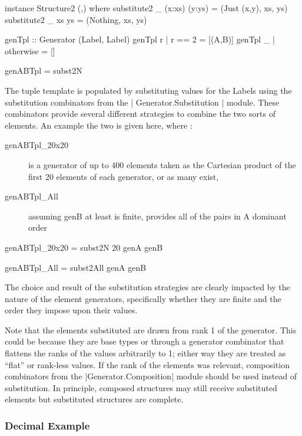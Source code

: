 \begin{code}
instance Structure2 (,) where
  substitute2 _ (x:xs) (y:ys) = (Just (x,y), xs, ys)
  substitute2 _ xs ys = (Nothing, xs, ys)
  
genTpl :: Generator (Label, Label)
genTpl r | r == 2    = [(A,B)]
genTpl _ | otherwise = []

genABTpl = subst2N
\end{code}

The tuple template is populated by substituting values for the Labels
using the substitution combinators from the | Generator.Substitution | module.
These combinators provide several different strategies to combine the two sorts of elements. 
An example the two is given here, where :

\begin{description}
\item[genABTpl\_20x20] { is a generator of up to 400 elements taken as 
the Cartesian product of the first 20 elements of each generator, or as many exist,}
\item[genABTpl\_All] {assuming genB at least is finite, provides all of the pairs in 
A dominant order}
\end{description}

\begin{code}
genABTpl_20x20 = subst2N 20 genA genB

genABTpl_All = subst2All genA genB
\end{code}

The choice and result of the substitution strategies are clearly impacted by
the nature of the element generators, specifically whether they are finite
and the order they impose upon their values.  

Note that the elements substituted are drawn from rank 1 of the generator.
This could be because they are base types or through a generator combinator
that flattens the ranks of the values arbitrarily to 1; either way they are treated
as ``flat'' or rank-less values.  If the rank of the elements was relevant,
composition combinators from the |Generator.Composition| module should be used
instead of substitution.  In principle, composed structures may still receive substituted elements
but substituted structures are complete.

\subsubsection {Decimal Example}



